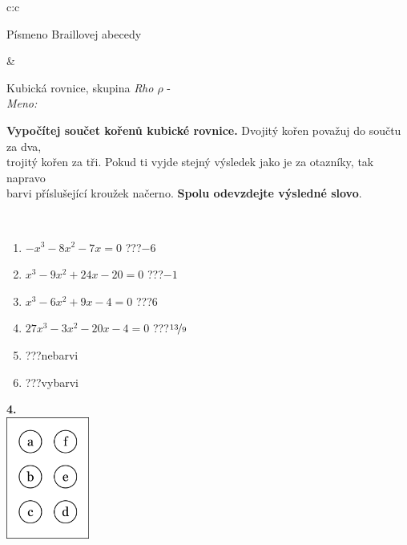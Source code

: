 \documentclass[10pt]{report}
\begin{document}
\begin{tabular}{c:c}
\begin{minipage}[c][104.5mm][t]{0.5\linewidth}
\begin{center}
\begin{minipage}{0.20\linewidth}
\begin{center}
{\small Písmeno Braillovej abecedy}
\end{center}
\end{minipage}
\end{center}
\end{minipage}
&
\begin{minipage}[c][104.5mm][t]{0.5\linewidth}
\begin{center}
\vspace{7mm}
{\huge Kubická rovnice, skupina \textit{Rho $\rho$} -}\\[5mm]
\textit{Meno:}\phantom{xxxxxxxxxxxxxxxxxxxxxxxxxxxxxxxxxxxxxxxxxxxxxxxxxxxxxxxxxxxxxxxxx}\\[5mm]
\begin{minipage}{0.95\linewidth}
\textbf{Vypočítej součet kořenů kubické rovnice.} Dvojitý kořen považuj do součtu za dva,\\trojitý kořen za tři. Pokud ti vyjde stejný výsledek jako je za otazníky, tak napravo\\barvi příslušející kroužek načerno. \textbf{Spolu odevzdejte výsledné slovo}.
\end{minipage}
\\[1mm]
\begin{minipage}{0.79\linewidth}
\begin{center}
\begin{varwidth}{\linewidth}
\begin{enumerate}
\Large
\item $-x^3-8x^2-7x=0$\quad \dotfill\; ???\;\dotfill \quad $-6$
\item $x^3-9x^2+24x-20=0$\quad \dotfill\; ???\;\dotfill \quad $-1$
\item $x^3-6x^2+9x-4=0$\quad \dotfill\; ???\;\dotfill \quad $6$
\item $27x^3-3x^2-20x-4=0$\quad \dotfill\; ???\;\dotfill \quad $\nicefrac{13}{9}$
\item \quad \dotfill\; ???\;\dotfill \quad nebarvi
\item \quad \dotfill\; ???\;\dotfill \quad vybarvi
\end{enumerate}
\end{varwidth}
\end{center}
\end{minipage}
\begin{minipage}{0.20\linewidth}
\begin{center}
{\Huge\bfseries 4.} \\[2mm]
\includegraphics[height=40mm]{../images/braille.png}

\end{center}
\end{minipage}
\end{center}
\end{minipage}
\end{tabular}
\end{document}
